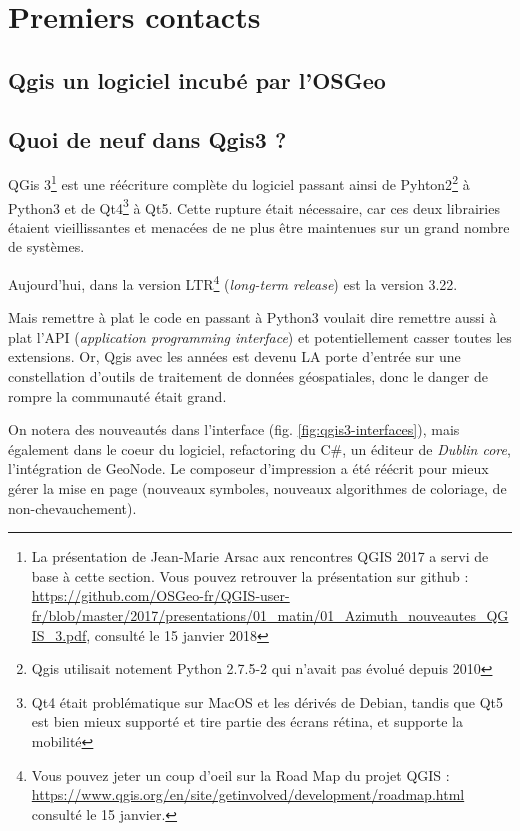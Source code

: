 \documentclass[a4paper, 11pt]{article}
\begin{document}
\section{Premiers contacts}
  \subsection{Qgis un logiciel incubé par l'OSGeo}

  \subsection{Quoi de neuf dans Qgis3 ?}
  QGis 3\footnote{La présentation de Jean-Marie Arsac aux rencontres QGIS 2017 a servi de base à cette section. Vous pouvez retrouver la présentation sur github : \url{https://github.com/OSGeo-fr/QGIS-user-fr/blob/master/2017/presentations/01_matin/01_Azimuth_nouveautes_QGIS_3.pdf}, consulté le 15 janvier 2018} est une réécriture complète du logiciel passant ainsi de Pyhton2\footnote{Qgis utilisait notement Python 2.7.5-2 qui n'avait pas évolué depuis 2010} à Python3 et de Qt4\footnote{Qt4 était problématique sur MacOS et les dérivés de Debian, tandis que Qt5 est bien mieux supporté et tire partie des écrans rétina, et supporte la mobilité} à Qt5. Cette rupture était nécessaire, car ces deux librairies étaient vieillissantes et menacées de ne plus être maintenues sur un grand nombre de systèmes.

  Aujourd’hui, dans la version LTR\footnote{Vous pouvez jeter un coup d'oeil sur la Road Map du projet QGIS : \url{https://www.qgis.org/en/site/getinvolved/development/roadmap.html} consulté le 15 janvier.} (\textit{long-term release}) est la version 3.22.

  Mais remettre à plat le code en passant à Python3 voulait dire remettre aussi à plat l'API (\textit{application programming interface}) et potentiellement casser toutes les extensions. Or, Qgis avec les années est devenu LA porte d'entrée sur une constellation d'outils de traitement de données géospatiales, donc le danger de rompre la communauté était grand.

  On notera des nouveautés dans l'interface (fig. \ref{fig:qgis3-interfaces}), mais également dans le coeur du logiciel, refactoring du C\#, un éditeur de \textit{Dublin core}, l'intégration de GeoNode. Le composeur d'impression a été réécrit pour mieux gérer la mise en page (nouveaux symboles, nouveaux algorithmes de coloriage, de non-chevauchement).
\end{document}

